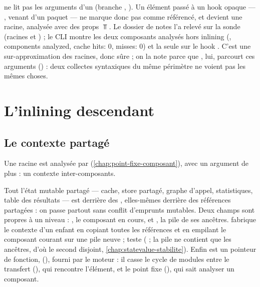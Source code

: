 ne lit pas les arguments d'un  (branche
\code{_ => {}}, ). Un élément passé à un hook opaque
--- ,  venant d'un paquet --- ne marque
donc pas  comme référencé, et  devient une racine, analysée avec des
props $\Top$. Le dossier de notes l'a relevé sur la sonde (racines  et
) ; le CLI montre les deux composants analysés hors inlining
(,  components analyzed\fg, \og cache hits: 0, misses: 0\fg) et la
seule \Info{} sur le hook . C'est une sur-approximation des racines, donc sûre ;
on la note parce que , lui, parcourt ces arguments
() : deux collectes \og syntaxiques\fg{} du même
périmètre ne voient pas les mêmes choses.

\section{L'inlining descendant}
\label{sec:inter-composants-inlining}

\subsection{Le contexte partagé }

Une racine est analysée par  (\cref{chap:point-fixe-composant}),
avec un argument de plus : un contexte inter-composants.


Tout l'état mutable partagé --- cache, store partagé, graphe d'appel, statistiques, table des
résultats --- est derrière des , elles-mêmes derrière des références partagées :
on passe  partout sans conflit d'emprunts mutables. Deux champs sont propres à
un niveau : , le composant en cours, et , la pile de ses
ancêtres.  fabrique le contexte d'un enfant en copiant toutes les références et
en empilant le composant courant sur une pile neuve ;  teste
 ( ; la
pile ne contient que les ancêtres, d'où le second disjoint, \cref{chap:statevalue-stabilite}).
Enfin  est un pointeur de fonction, 
(), fourni par le moteur : il casse le cycle de modules
entre le transfert (), qui rencontre l'élément, et le point fixe
(), qui sait analyser un composant.

